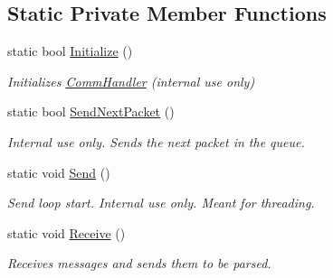 \subsection*{Static Private Member Functions}
\begin{DoxyCompactItemize}
\item 
static bool \hyperlink{class_robotics_library_1_1_communications_1_1_comm_handler_a1f6112825a07338045b07ba17a3e1d6b}{Initialize} ()
\begin{DoxyCompactList}\small\item\em Initializes \hyperlink{class_robotics_library_1_1_communications_1_1_comm_handler}{Comm\+Handler} (internal use only) \end{DoxyCompactList}\item 
static bool \hyperlink{class_robotics_library_1_1_communications_1_1_comm_handler_a0f3233960b73b33e8a94adef22fb9e2f}{Send\+Next\+Packet} ()
\begin{DoxyCompactList}\small\item\em Internal use only. Sends the next packet in the queue. \end{DoxyCompactList}\item 
static void \hyperlink{class_robotics_library_1_1_communications_1_1_comm_handler_a352403b8c19552676bb30cf55d54d8fb}{Send} ()
\begin{DoxyCompactList}\small\item\em Send loop start. Internal use only. Meant for threading. \end{DoxyCompactList}\item 
static void \hyperlink{class_robotics_library_1_1_communications_1_1_comm_handler_acae63122b382ab558378208db5e72680}{Receive} ()
\begin{DoxyCompactList}\small\item\em Receives messages and sends them to be parsed. \end{DoxyCompactList}\end{DoxyCompactItemize}
